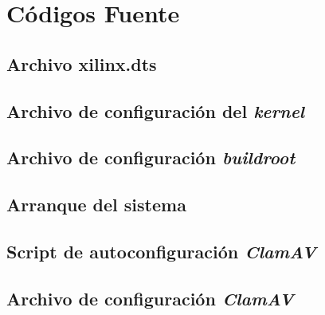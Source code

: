 \chapter{Códigos Fuente}\label{ApexB}

\section{Archivo xilinx.dts}



\newpage

\section{Archivo de configuración del \emph{kernel}}



\section{Archivo de configuración \emph{buildroot}}



\section{Arranque del sistema}





\section{Script de autoconfiguración \emph{ClamAV}}



\section{Archivo de configuración \emph{ClamAV}}


